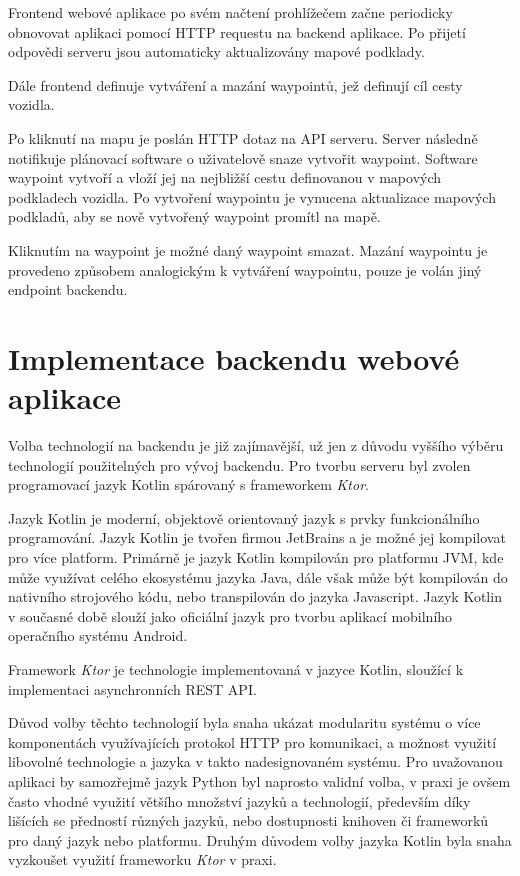 \documentclass[czech, bachelor]{diploma}
\begin{document}
Frontend webové aplikace po svém načtení prohlížečem začne periodicky obnovovat aplikaci pomocí HTTP requestu na backend aplikace.
Po přijetí odpovědi serveru jsou automaticky aktualizovány mapové podklady.

Dále frontend definuje vytváření a mazání waypointů, jež definují cíl cesty vozidla. 

Po kliknutí na mapu je poslán HTTP dotaz na API serveru. Server následně notifikuje plánovací software o uživatelově snaze 
vytvořit waypoint. Software waypoint vytvoří a vloží jej na nejbližší cestu definovanou v mapových podkladech vozidla. 
Po vytvoření waypointu je vynucena aktualizace mapových podkladů, aby se nově vytvořený waypoint promítl na mapě.

Kliknutím na waypoint je možné daný waypoint smazat. Mazání waypointu je provedeno způsobem analogickým k vytváření waypointu,
pouze je volán jiný endpoint backendu.

\section{Implementace backendu webové aplikace}

Volba technologií na backendu je již zajímavější, už jen z důvodu vyššího výběru technologií použitelných pro vývoj backendu.
Pro tvorbu serveru byl zvolen programovací jazyk Kotlin spárovaný s frameworkem \emph{Ktor}. 

Jazyk Kotlin je moderní, objektově orientovaný jazyk s prvky funkcionálního programování. Jazyk Kotlin je tvořen firmou JetBrains
a je možné jej kompilovat pro více platform. Primárně je jazyk Kotlin kompilován pro platformu JVM, kde může využívat celého 
ekosystému jazyka Java, dále však může být kompilován do nativního strojového kódu, nebo transpilován do jazyka Javascript. Jazyk
Kotlin v současné době slouží jako oficiální jazyk pro tvorbu aplikací mobilního operačního systému Android.

Framework \emph{Ktor} je technologie implementovaná v jazyce Kotlin, sloužící k implementaci asynchronních REST API. 

Důvod volby těchto technologií byla snaha ukázat modularitu systému o více komponentách využívajících protokol HTTP 
pro komunikaci, a možnost využití libovolné technologie a jazyka v takto nadesignovaném systému. Pro uvažovanou aplikaci by 
samozřejmě jazyk Python byl naprosto validní volba, v praxi je ovšem často vhodné využití většího množství jazyků a technologií, 
především díky lišících se předností různých jazyků, nebo dostupnosti knihoven či frameworků pro daný jazyk nebo platformu. Druhým
důvodem volby jazyka Kotlin byla snaha vyzkoušet využití frameworku \emph{Ktor} v praxi.
\end{document}

